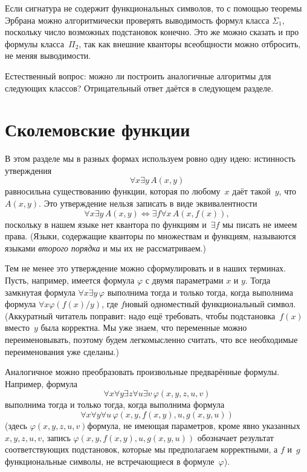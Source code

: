 Если сигнатура не содержит функциональных символов, то с помощью теоремы
Эрбрана можно алгоритмически проверять выводимость формул
класса $\Sigma_1$, поскольку число возможных подстановок
конечно. Это же можно сказать и про формулы класса~$\Pi_2$, так
как внешние кванторы всеобщности можно отбросить, не меняя
выводимости.

Естественный вопрос: можно ли построить аналогичные алгоритмы
для следующих классов? Отрицательный ответ даётся в следующем
разделе.

\section{Сколемовские функции}
%
%

В этом разделе мы в разных формах используем ровно одну идею:
истинность утверждения
        $$
\forall x \exists y \, A(x,y)
        $$
равносильна существованию функции, которая по любому~$x$ даёт такой~$y$, что
$A(x,y)$. Это утверждение нельзя записать в виде эквивалентности
        $$
\forall x\exists y \, A(x,y) \Leftrightarrow \exists f \forall x\, A(x,f(x)),
        $$
поскольку в нашем языке нет квантора по функциям
и~$\exists f$ мы писать не имеем права. (Языки, содержащие кванторы по
множествам и функциям, называются языками \emph{второго
порядка}%
и мы их не рассматриваем.)

Тем не менее это утверждение можно сформулировать и в наших
терминах. Пусть, например, имеется формула $\varphi$ с двумя
параметрами $x$ и $y$. Тогда замкнутая формула
        $\forall x \exists y\,\varphi$
выполнима тогда и только тогда, когда выполнима формула
        $\forall x \varphi(f(x)/y)$,
где $f$\т новый одноместный функциональный символ. (Аккуратный
читатель поправит: надо ещё требовать, чтобы подстановка~$f(x)$
вместо~$y$ была корректна. Мы уже знаем, что переменные можно
переименовывать, поэтому будем легкомысленно считать, что все
необходимые переименования уже сделаны.)

Аналогичное можно преобразовать произвольные предварённые
формулы. Например, формула
        $$
\forall x \forall y \exists z \forall u \exists v\,\varphi (x,y,z,u,v)
        $$
выполнима тогда и только тогда, когда выполнима формула
        $$
\forall x \forall y \forall u\,\varphi (x,y,f(x,y),u,g(x,y,u))
        $$
\label{skolem-functions-example}%
(здесь $\varphi(x,y,z,u,v)$\т формула, не имеющая
параметров, кроме явно указанных $x,y,z,u,v$, запись
$\varphi(x,y,f(x,y),u,g(x,y,u))$
обозначает результат соответствующих подстановок, которые мы
предполагаем корректными, а $f$ и~$g$\т функциональные символы,
не встречающиеся в формуле~$\varphi$).

